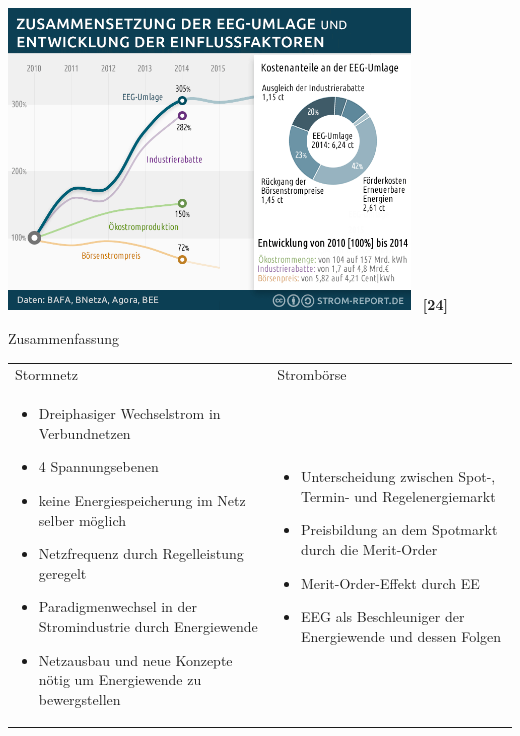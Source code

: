 \documentclass[aspectratio=1610, professionalfonts, 9pt]{beamer}
\begin{document}
{
\begin{frame}
  \centering
  \includegraphics[width=0.8\textwidth]{images/eeg-umlage.png} \ \textbf{\textcolor{tugreen}{[24]}}
\end{frame}
}




\begin{frame}{Zusammenfassung}
\begin{tabular}{p{}p{}}
   Stormnetz  &         Strombörse\\
\begin{itemize}
  \item Dreiphasiger Wechselstrom in Verbundnetzen
  \item 4 Spannungsebenen
  \item keine Energiespeicherung im Netz selber möglich
  \item Netzfrequenz durch Regelleistung geregelt
  \item Paradigmenwechsel in der Stromindustrie durch Energiewende
  \item Netzausbau und neue Konzepte nötig um Energiewende zu bewergstellen
\end{itemize}

&
\begin{itemize}
  \item Unterscheidung zwischen Spot-, Termin- und Regelenergiemarkt
  \item Preisbildung an dem Spotmarkt durch die Merit-Order
  \item Merit-Order-Effekt durch EE
  \item EEG als Beschleuniger der Energiewende und dessen Folgen
\end{itemize}

\end{tabular}
\end{frame}
\end{document}
